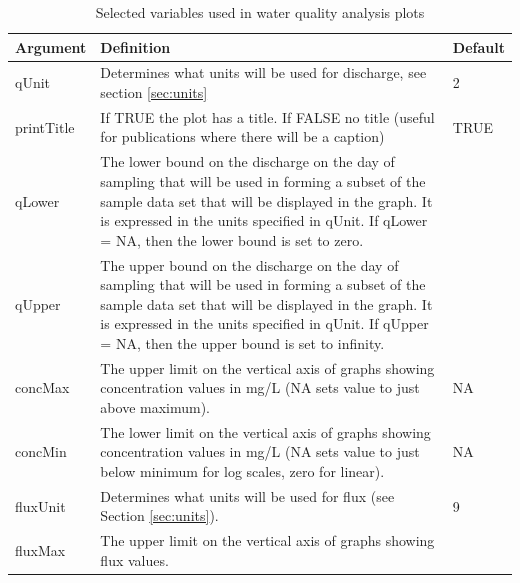 \documentclass[a4paper,11pt]{article}\usepackage[]{graphicx}\usepackage[]{color}
\begin{document}
\begin{table}[ht]
\caption{Selected variables used in water quality analysis plots  \label{tab:wqVariables}}
\begin{tabularx}{\textwidth}{lXl}
\hline
  \textbf{Argument} & \textbf{Definition} & \textbf{Default} \\
\hline
qUnit & Determines what units will be used for discharge, see section \ref{sec:units} & 2\\
printTitle & If TRUE the plot has a title.  If FALSE no title (useful for publications where there will be a caption) & TRUE\\
qLower & The lower bound on the discharge on the day of sampling that will be used in forming a subset of the sample data set that will be displayed in the graph.  It is expressed in the units specified in qUnit.  If qLower = NA, then the lower bound is set to zero. & \\
qUpper & The upper bound on the discharge on the day of sampling that will be used in forming a subset of the sample data set that will be displayed in the graph.  It is expressed in the units specified in qUnit.  If qUpper = NA, then the upper bound is set to infinity. & \\
concMax & The upper limit on the vertical axis of graphs showing concentration values in mg/L (NA sets value to just above maximum).  & NA\\
concMin & The lower limit on the vertical axis of graphs showing concentration values in mg/L (NA sets value to just below minimum for log scales, zero for linear). & NA\\
fluxUnit & Determines what units will be used for flux (see Section \ref{sec:units}). & 9\\
fluxMax & The upper limit on the vertical axis of graphs showing flux values. & \\
\hline
\end{tabularx}

\end{table}

\FloatBarrier
\clearpage
\end{document}
